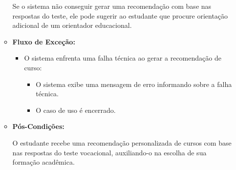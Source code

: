 \begin{itemize}
\begin{itemize}
        Se o sistema não conseguir gerar uma recomendação com base nas respostas do teste, ele pode sugerir ao estudante que procure orientação adicional de um orientador educacional.
        \item \textbf{Fluxo de Exceção:}
        \begin{itemize}
            \item O sistema enfrenta uma falha técnica ao gerar a recomendação de curso:
            \begin{itemize}
                \item O sistema exibe uma mensagem de erro informando sobre a falha técnica.
                \item O caso de uso é encerrado.
            \end{itemize}
        \end{itemize}
        \item \textbf{Pós-Condições:}

        O estudante recebe uma recomendação personalizada de cursos com base nas respostas do teste vocacional, auxiliando-o na escolha de sua formação acadêmica.
    \end{itemize}
\end{itemize}
